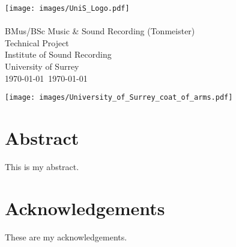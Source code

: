 
\graphicspath{{FrontMatter/}}

\begin{titlepage}
\thispagestyle{empty}
\hfill\texttt{[image: images/UniS\_Logo.pdf]}
{\sf
\centering
\null\vfil\vfil
	{
		\huge\LongTitle\\
	}
\vfil\vfil\vfil
	{
		\Large\Me\\
	}
\vfil\vfil\vfil
	{
		\Large{}BMus/BSc Music \& Sound Recording (Tonmeister)\\
		Technical Project\\
	}
\vfil\vfil
	{
		\Large{}Institute of Sound Recording\\
		University of Surrey\\
	}
\vfil
	{
		\Large\MyMonth\today~\MyYear\today\\}
	}

	{
		\texttt{[image: images/University\_of\_Surrey\_coat\_of\_arms.pdf]}
		\vspace{-.4in}
	}
\end{titlepage}

\setlength{\parskip}{1ex plus 0.2ex minus 0.2ex} %
\onehalfspacing



\chapter*{Abstract}
\thispagestyle{empty}
\setcounter{page}{2}

This is my abstract.

\frontmatter

\singlespacing

\setlength{\parskip}{0ex} %

\clearpage
{}
\tableofcontents
\clearpage
{}
{}
\listoffigures
\clearpage
{}
{}
\listoftables

\setlength{\parskip}{1ex plus 0.2ex minus 0.2ex} %

\onehalfspacing

\chapter{Acknowledgements}

These are my acknowledgements.